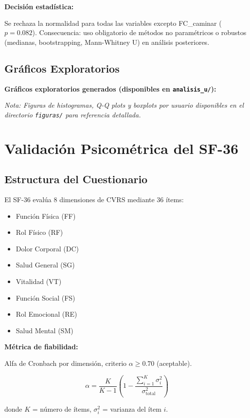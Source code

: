 \documentclass[12pt,letterpaper,twoside]{report}
\begin{document}
\begin{decisionbox}
\textbf{Decisión estadística:}

Se rechaza la normalidad para todas las variables excepto FC\_caminar ($p=0.082$). Consecuencia: uso obligatorio de métodos no paramétricos o robustos (medianas, bootstrapping, Mann-Whitney U) en análisis posteriores.
\end{decisionbox}

\subsection{Gráficos Exploratorios}

\textbf{Gráficos exploratorios generados (disponibles en \texttt{analisis\_u/}):}

\textit{Nota: Figuras de histogramas, Q-Q plots y boxplots por usuario disponibles en el directorio \texttt{figuras/} para referencia detallada.}

\section{Validación Psicométrica del SF-36}

\subsection{Estructura del Cuestionario}

El SF-36 evalúa 8 dimensiones de CVRS mediante 36 ítems:
\begin{itemize}[noitemsep]
    \item Función Física (FF)
    \item Rol Físico (RF)
    \item Dolor Corporal (DC)
    \item Salud General (SG)
    \item Vitalidad (VT)
    \item Función Social (FS)
    \item Rol Emocional (RE)
    \item Salud Mental (SM)
\end{itemize}

\begin{estadisticobox}
\textbf{Métrica de fiabilidad:}

Alfa de Cronbach por dimensión, criterio $\alpha \geq 0.70$ (aceptable).

\begin{equation}
\alpha = \frac{K}{K-1} \left( 1 - \frac{\sum_{i=1}^{K} \sigma^2_i}{\sigma^2_{\text{total}}} \right)
\end{equation}

donde $K$ = número de ítems, $\sigma^2_i$ = varianza del ítem $i$.
\end{estadisticobox}
\end{document}
